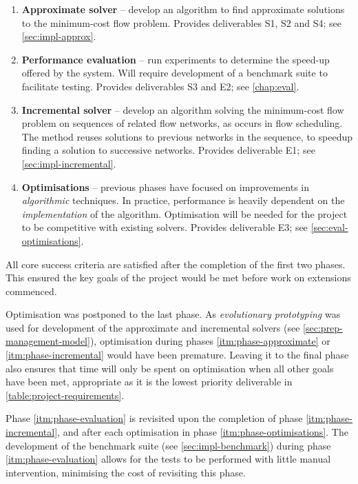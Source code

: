 \begin{enumerate}
    \item \label{itm:phase-approximate}
        \textbf{Approximate solver} -- develop an algorithm to find approximate solutions to the minimum-cost flow problem. Provides deliverables S1, S2 and S4; see \cref{sec:impl-approx}.
    \item \label{itm:phase-evaluation} 
        \textbf{Performance evaluation} -- run experiments to determine the speed-up offered by the system. Will require development of a benchmark suite to facilitate testing. Provides deliverables S3 and E2; see \cref{chap:eval}.
    \item \label{itm:phase-incremental} 
        \textbf{Incremental solver} -- develop an algorithm solving the minimum-cost flow problem on sequences of related flow networks, as occurs in flow scheduling. The method reuses solutions to previous networks in the sequence, to speedup finding a solution to successive networks. Provides deliverable E1; see \cref{sec:impl-incremental}.
    \item \label{itm:phase-optimisations}
        \textbf{Optimisations} -- previous phases have focused on improvements in \emph{algorithmic} techniques. In practice, performance is heavily dependent on the \emph{implementation} of the algorithm. Optimisation will be needed for the project to be competitive with existing solvers. Provides deliverable E3; see \cref{sec:eval-optimisations}.
\end{enumerate}

All core success criteria are satisfied after the completion of the first two phases. This ensured the key goals of the project would be met before work on extensions commenced. 

Optimisation was postponed to the last phase. As \emph{evolutionary prototyping} was used for development of the approximate and incremental solvers (see \cref{sec:prep-management-model}), optimisation during phases \ref{itm:phase-approximate} or \ref{itm:phase-incremental} would have been premature. Leaving it to the final phase also ensures that time will only be spent on optimisation when all other goals have been met, appropriate as it is the lowest priority deliverable in \cref{table:project-requirements}.

Phase \ref{itm:phase-evaluation} is revisited upon the completion of phase \ref{itm:phase-incremental}, and after each optimisation in phase \ref{itm:phase-optimisations}. The development of the benchmark suite (see \cref{sec:impl-benchmark}) during phase \ref{itm:phase-evaluation} allows for the tests to be performed with little manual intervention, minimising the cost of revisiting this phase.

